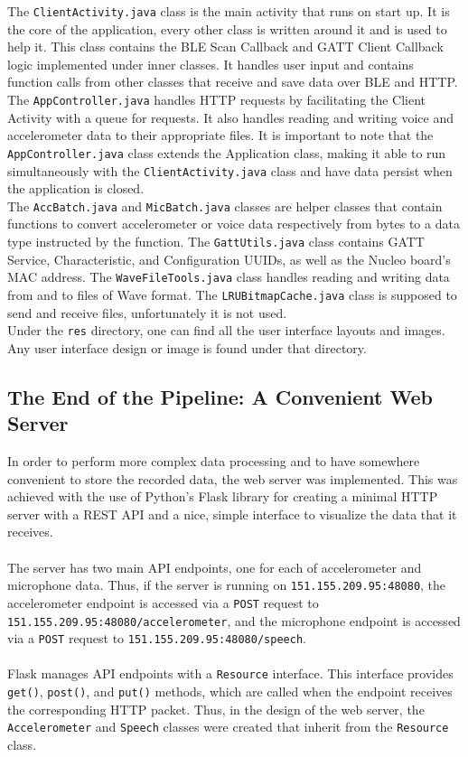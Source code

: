 The \texttt{ClientActivity.java} class is the main activity that runs on start up. It is the core of the application, every other class is written around it and is used to help it. This class contains the BLE Scan Callback and GATT Client Callback logic implemented under inner classes. It handles user input and contains function calls from other classes that receive and save data over BLE and HTTP.\\

The \texttt{AppController.java} handles HTTP requests by facilitating the Client Activity with a queue for requests. It also handles reading and writing voice and accelerometer data to their appropriate files. It is important to note that the \texttt{AppController.java} class extends the Application class, making it able to run simultaneously with the \texttt{ClientActivity.java} class and have data persist when the application is closed.\\

The \texttt{AccBatch.java} and \texttt{MicBatch.java} classes are helper classes that contain functions to convert accelerometer or voice data respectively from bytes to a data type instructed by the function. The \texttt{GattUtils.java} class contains GATT Service, Characteristic, and Configuration UUIDs, as well as the Nucleo board's MAC address. The \texttt{WaveFileTools.java} class handles reading and writing data from and to files of Wave format. The \texttt{LRUBitmapCache.java} class is supposed to send and receive files, unfortunately it is not used.\\

Under the \texttt{res} directory, one can find all the user interface layouts and images. Any user interface design or image is found under that directory. 
\subsection{The End of the Pipeline: A Convenient Web Server}
In order to perform more complex data processing and to have somewhere convenient to store the
recorded data, the web server was implemented. This was achieved with the use of Python's Flask
library for creating a minimal HTTP server with a REST API and a nice, simple interface to visualize
the data that it receives.\\\\
The server has two main API endpoints, one for each of accelerometer and microphone data. Thus, if
the server is running on \texttt{151.155.209.95:48080}, the accelerometer endpoint is accessed via a
\texttt{POST} request to \texttt{151.155.209.95:48080/accelerometer}, and the microphone endpoint is
accessed via a \texttt{POST} request to \texttt{151.155.209.95:48080/speech}.\\\\
Flask manages API endpoints with a \texttt{Resource} interface. This interface provides
\texttt{get()}, \texttt{post()}, and \texttt{put()} methods, which are called when the endpoint
receives the corresponding HTTP packet. Thus, in the design of the web server, the
\texttt{Accelerometer} and \texttt{Speech} classes were created that inherit from the
\texttt{Resource} class.
